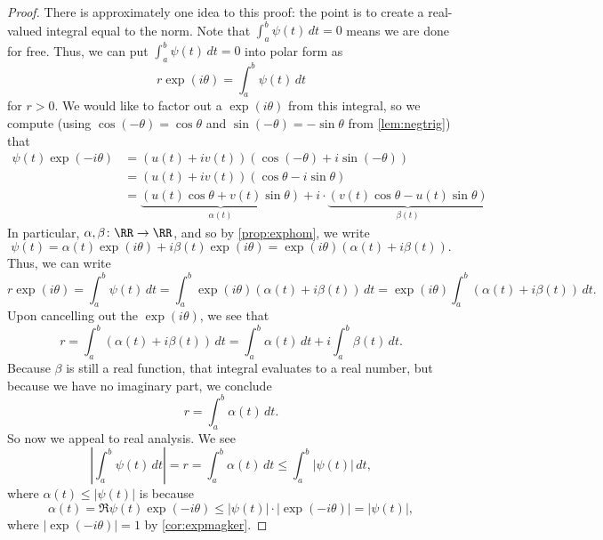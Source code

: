 \begin{proof}
	There is approximately one idea to this proof: the point is to create a real-valued integral equal to the norm. Note that $\int_a^b\psi(t)\,dt=0$ means we are done for free. Thus, we can put $\int_a^b\psi(t)\,dt=0$ into polar form as
	\[r\exp(i\theta)=\int_a^b\psi(t)\,dt\]
	for $r>0$. We would like to factor out a $\exp(i\theta)$ from this integral, so we compute (using $\cos(-\theta)=\cos\theta$ and $\sin(-\theta)=-\sin\theta$ from \autoref{lem:negtrig}) that
	\begin{align*}
		\psi(t)\exp(-i\theta) &= (u(t)+iv(t))(\cos(-\theta)+i\sin(-\theta)) \\
		&= (u(t)+iv(t))(\cos\theta-i\sin\theta) \\
		&= \underbrace{(u(t)\cos\theta+v(t)\sin\theta)}_{\alpha(t)}+i\cdot\underbrace{(v(t)\cos\theta-u(t)\sin\theta)}_{\beta(t)}
	\end{align*}
	In particular, $\alpha,\beta\colon \RR\to\RR$, and so by \autoref{prop:exphom}, we write
	\[\psi(t)=\alpha(t)\exp(i\theta)+i\beta(t)\exp(i\theta)=\exp(i\theta)(\alpha(t)+i\beta(t)).\]
	Thus, we can write
	\[r\exp(i\theta)=\int_a^b\psi(t)\,dt=\int_a^b\exp(i\theta)(\alpha(t)+i\beta(t))\,dt=\exp(i\theta)\int_a^b(\alpha(t)+i\beta(t))\,dt.\]
	Upon cancelling out the $\exp(i\theta)$, we see that
	\[r=\int_a^b(\alpha(t)+i\beta(t))\,dt=\int_a^b\alpha(t)\,dt+i\int_a^b\beta(t)\,dt.\]
	Because $\beta$ is still a real function, that integral evaluates to a real number, but because we have no imaginary part, we conclude
	\[r=\int_a^b\alpha(t)\,dt.\]
	So now we appeal to real analysis. We see
	\[\left|\int_a^b\psi(t)\,dt\right|=r=\int_a^b\alpha(t)\,dt\le\int_a^b|\psi(t)|\,dt,\]
	where $\alpha(t)\le|\psi(t)|$ is because
	\[\alpha(t)=\Re\psi(t)\exp(-i\theta)\le|\psi(t)|\cdot|\exp(-i\theta)|=|\psi(t)|,\]
	where $|\exp(-i\theta)|=1$ by \autoref{cor:expmagker}.
\end{proof}


